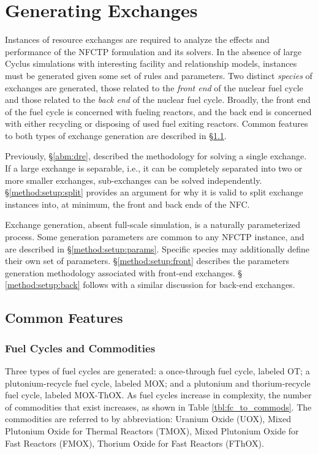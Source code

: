 
\section{Generating Exchanges}\label{method:setup}

Instances of resource exchanges are required to analyze the effects and
performance of the NFCTP formulation and its solvers. In the absence of large
Cyclus simulations with interesting facility and relationship models, instances
must be generated given some set of rules and parameters. Two distinct
\textit{species} of exchanges are generated, those related to the \textit{front
  end} of the nuclear fuel cycle and those related to the \textit{back end} of
the nuclear fuel cycle. Broadly, the front end of the fuel cycle is concerned
with fueling reactors, and the back end is concerned with either recycling or
disposing of used fuel exiting reactors. Common features to both types of
exchange generation are described in \S \ref{method:setup:features}.

Previously, \S \ref{abm:dre}, described the methodology for solving a single
exchange. If a large exchange is separable, i.e., it can be completely separated
into two or more smaller exchanges, sub-exchanges can be solved
independently. \S \ref{method:setup:split} provides an argument for why it is
valid to split exchange instances into, at minimum, the front and back ends of
the NFC.

Exchange generation, absent full-scale simulation, is a naturally parameterized
process. Some generation parameters are common to any NFCTP instance, and are
described in \S \ref{method:setup:params}. Specific species may additionally
define their own set of parameters. \S \ref{method:setup:front} describes the
parameters generation methodology associated with front-end exchanges. \S
\ref{method:setup:back} follows with a similar discussion for back-end
exchanges.  

\subsection{Common Features}\label{method:setup:features}

\subsubsection{Fuel Cycles and Commodities}

Three types of fuel cycles are generated: a once-through fuel cycle, labeled
OT; a plutonium-recycle fuel cycle, labeled MOX; and a plutonium and
thorium-recycle fuel cycle, labeled MOX-ThOX. As fuel cycles increase in
complexity, the number of commodities that exist increases, as shown in Table
\ref{tbl:fc_to_commods}. The commodities are referred to by abbreviation:
Uranium Oxide (UOX), Mixed Plutonium Oxide for Thermal Reactors (TMOX), Mixed
Plutonium Oxide for Fast Reactors (FMOX), Thorium Oxide for Fast Reactors
(FThOX).

